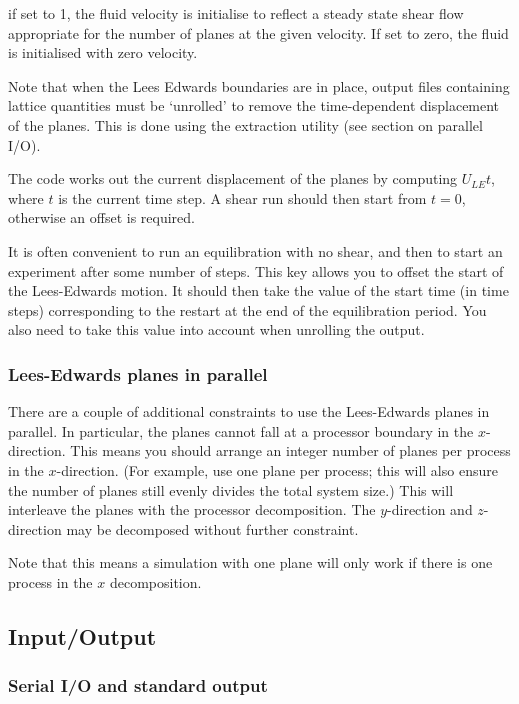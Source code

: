 if set to 1, the fluid velocity is initialise to reflect a steady
state shear flow appropriate for the number of planes at the
given velocity. If set to zero, the fluid is initialised with
zero velocity.

Note that when the Lees Edwards boundaries are in place, output
files containing lattice quantities must be `unrolled' to remove
the time-dependent displacement of the planes. This is done using
the extraction utility (see section on parallel I/O).

The code works out the
current displacement of the planes by computing $U_{LE} t$, where
$t$ is the current time step. A shear run should then start from
$t = 0$, otherwise an offset is required.


It is often convenient to run an equilibration with no shear, and
then to start an experiment after some number of steps. This
key allows you to offset the start of the Lees-Edwards motion.
It should then take the value of the start time (in time steps)
corresponding to the restart at the end of the equilibration
period. You also need to take this value into account when unrolling
the output.

\subsubsection{Lees-Edwards planes in parallel} 

There are a couple of additional constraints to use the Lees-Edwards
planes in parallel. In particular, the planes cannot fall at a
processor boundary in the $x$-direction. This means you should
arrange an integer number of planes per process in the $x$-direction.
(For example, use one plane per process; this will also ensure the number
of planes
still evenly divides the total system size.)
This will interleave the planes with the processor decomposition.
The $y$-direction and $z$-direction may be decomposed without
further constraint.

Note that this means a simulation with one plane will only work
if there is one process in the $x$ decomposition.

\subsection{Input/Output}

\subsubsection{Serial I/O and standard output}

